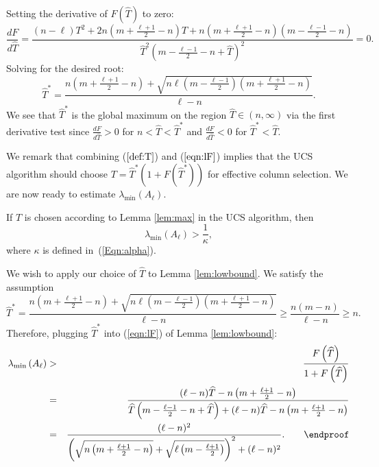 \documentclass[final,leqno,onefignum,onetabnum]{siamltex1213}
\begin{document}
\proof
Setting the derivative of $F\left(\widehat{T}\right)$ to zero:
$${\displaystyle \frac{dF}{d\widehat{T}}=\frac{\left(n-\ell \right)T^2 + 2n\left(m + \frac{\ell+1}{2}-n \right) T + n\left( m+\frac{\ell+1}{2}-n \right) \left( m-\frac{\ell - 1}{2}-n \right) }{\widehat{T}^2\left( m-\frac{\ell - 1}{2}-n+\widehat{T}\right)^2} = 0.}$$
Solving for the desired root:
$$\widehat{T}^*=\frac{n\left(m+\frac{\ell+1}{2}-n\right)+\sqrt{n\ell\left(m-\frac{\ell - 1}{2}\right)\left(m+\frac{\ell+1}{2}-n\right)}}{\ell - n}.$$
We see that $\widehat{T}^*$ is the global maximum on the region $\widehat{T} \in \left(n, \infty \right)$ via the first derivative test since $\frac{dF}{d\widehat{T}} > 0$ for $n < \widehat{T} < \widehat{T}^*$ and $\frac{dF}{d\widehat{T}} < 0$ for $\widehat{T}^* < \widehat{T}$.
\hspace{2 em}\endproof

We remark that combining ($\ref{def:T}$) and ($\ref{eqn:lF}$) implies that the UCS algorithm should choose 
$T = \widehat{T}^*\left(1+F\left(\widehat{T}^*\right)\right)$ for effective column selection. We are now ready to estimate $\lambda_{\min} \left( A_{\ell}\right)$.
\begin{theorem} \label{thm:lower}
If $T$ is chosen according to Lemma \ref{lem:max} in the UCS algorithm, then
\[{\displaystyle \lambda_{\min} \left( A_{\ell} \right) > \frac{1}{\kappa},} \]
where $\kappa$ is defined in~(\ref{Eqn:alpha}).
\end{theorem} 
\proof We wish to apply our choice of $\widehat{T}$ to Lemma \ref{lem:lowbound}. We satisfy the assumption
\[{\displaystyle  \widehat{T}^*=\frac{n\left(m+\frac{\ell+1}{2}-n\right)+\sqrt{n\ell\left(m-\frac{\ell - 1}{2}\right)\left(m+\frac{\ell+1}{2}-n\right)}}{\ell - n} \geq \frac{n\left(m-n\right)}{\ell - n} \geq n .}\]
Therefore, plugging $\widehat{T}^*$ into (\ref{eqn:lF}) of Lemma \ref{lem:lowbound}: 
\begin{eqnarray}
\lambda_{\min} \left( A_{\ell} \right)&>&\frac{F\left(\widehat{T}\right)}{1+F\left(\widehat{T}\right)}\nonumber\\
&=&\frac{(\ell - n)\widehat{T}-n\left(m+\frac{\ell+1}{2}-n\right)}{\widehat{T}\left(m-\frac{\ell - 1}{2}-n+\widehat{T}\right)+(\ell - n)\widehat{T}-n\left(m+\frac{\ell+1}{2}-n\right)}\nonumber\\
&=&\frac{(\ell - n)^2}{\left(\sqrt{n\left(m+\frac{\ell+1}{2}-n\right)}+\sqrt{\ell\left(m-\frac{\ell+1}{2}\right)}\right)^2+(\ell - n)^2}. \hspace{2 em}\endproof\nonumber \end{eqnarray}
\end{document}
